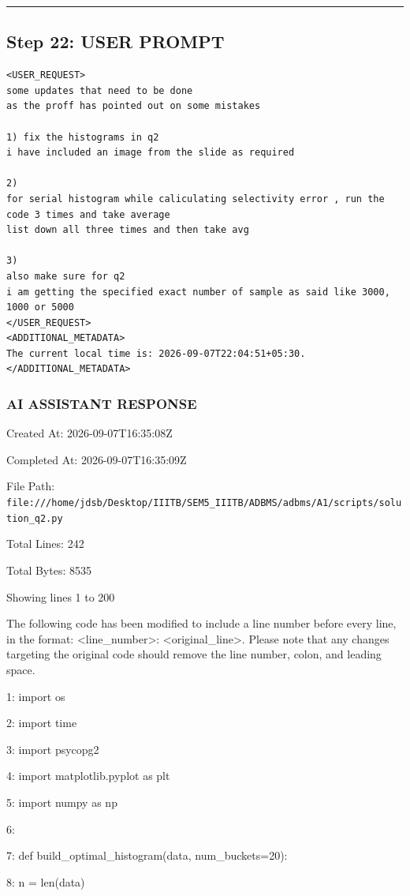 \documentclass[11pt,a4paper]{article}
\begin{document}
\hrule

\subsection{Step 22: USER PROMPT}

\begin{lstlisting}[language=text]
<USER_REQUEST>
some updates that need to be done 
as the proff has pointed out on some mistakes 

1) fix the histograms in q2 
i have included an image from the slide as required 

2)
for serial histogram while caliculating selectivity error , run the code 3 times and take average
list down all three times and then take avg

3)
also make sure for q2 
i am getting the specified exact number of sample as said like 3000, 1000 or 5000
</USER_REQUEST>
<ADDITIONAL_METADATA>
The current local time is: 2026-09-07T22:04:51+05:30.
</ADDITIONAL_METADATA>
\end{lstlisting}


\subsubsection{AI ASSISTANT RESPONSE}

Created At: 2026-09-07T16:35:08Z

Completed At: 2026-09-07T16:35:09Z

File Path: \texttt{file:///home/jdsb/Desktop/IIITB/SEM5\_IIITB/ADBMS/adbms/A1/scripts/solution\_q2.py}

Total Lines: 242

Total Bytes: 8535

Showing lines 1 to 200

The following code has been modified to include a line number before every line, in the format: <line\_number>: <original\_line>. Please note that any changes targeting the original code should remove the line number, colon, and leading space.

1: import os

2: import time

3: import psycopg2

4: import matplotlib.pyplot as plt

5: import numpy as np

6:

7: def build\_optimal\_histogram(data, num\_buckets=20):

8:     n = len(data)
\end{document}
